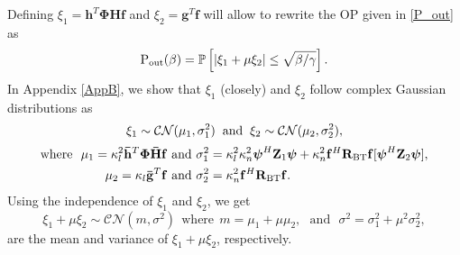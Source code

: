 \documentclass[journal,draftclsnofoot,onecolumn,12pt]{IEEEtran}
\begin{document}
Defining  $\xi_1 = \mathbf{h}^T\mathbf{\Phi Hf}$ and $\xi_2 =  \mathbf{g}^T\mathbf{f}$ will allow to rewrite the OP given in \eqref{P_out}  as
\begin{equation*}
    \text{P}_{\rm out}(\beta) = \mathbb{P}\left[|\xi_1 + \mu \xi_2| \leq \sqrt{\beta/\gamma}\right].
\end{equation*}
 In  Appendix \ref{AppB}, we show that $\xi_1$ (closely) and $\xi_2$ follow complex Gaussian distributions as 
\begin{equation}
\xi_1\sim\mathcal{C}\mathcal{N}(\mu_1,\sigma_1^2)\hspace{0.2cm}\text{and}\hspace{0.2cm} 
    \xi_2\sim\mathcal{C}\mathcal{N}(\mu_2,\sigma_2^2),\label{eq:xi1xi2}
\end{equation}
\begin{align*}
\text{where}~~ \mu_1 =\kappa_l^2\mathbf{\Bar{h}}^T\mathbf{\Phi \bar{H}f} &\text{~and~}\sigma_1^2 =\kappa_l^2\kappa_n^2\boldsymbol{\psi}^H\mathbf{Z}_1\boldsymbol{\psi} + \kappa_n^2\mathbf{f}^H\mathbf{R}_{\rm BT}\mathbf{f}[\boldsymbol{\psi}^H\mathbf{Z}_2\boldsymbol{\psi}],\\ 
    \mu_2 = \kappa_l\mathbf{\Bar{g}}^T\mathbf{f} &\text{~and~}\sigma_2^2 =\kappa_n^2\mathbf{f}^H\mathbf{R}_{\rm BT}\mathbf{f}.
\end{align*} 
Using the independence of $\xi_1$ and $\xi_2$, we get
\begin{equation}
    \xi_1 + \mu\xi_2\sim\mathcal{C}\mathcal{N}(m,\sigma^2)
~~\text{where}~~m = \mu_1+\mu\mu_2,
  \text{~~and~~}  \sigma^2 = \sigma_1^2+\mu^2\sigma_2^2,  \label{parameters_m_sigma}
\end{equation} 
are the mean and variance of $\xi_1 + \mu \xi_2$, respectively.
\end{document}
